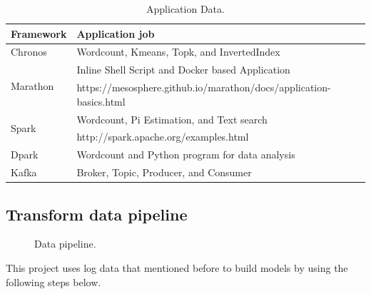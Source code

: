 \documentclass[12pt,oneside,openright,a4paper]{cpe-english-project}
\begin{document}
\begin{table}[!h]
  \caption{Application Data.}\label{tbl:ApplicationData}
    \begin{tabular}{@{}|p{}|p{}|}
    \hline
    \textbf{Framework} & \textbf{Application job}\\
    \hline
    Chronos & Wordcount, Kmeans, Topk, and InvertedIndex\\
    \hline
    \multirow{2}{*}{Marathon} & Inline Shell Script and Docker based Application \\
    & https://mesosphere.github.io/marathon/docs/application-basics.html\\
    \hline
    \multirow{2}{*}{Spark} & Wordcount, Pi Estimation, and Text search\\
    & http://spark.apache.org/examples.html\\
    \hline
    Dpark & Wordcount and Python program for data analysis\\
    \hline
    Kafka & Broker, Topic, Producer, and Consumer\\
    \hline
  \end{tabular}
\end{table}

\newpage

\subsection{Transform data pipeline}

\begin{figure}[!h]\centering
  \setlength{\fboxrule}{0mm} %
  \setlength{\fboxsep}{0cm}
  \caption{Data pipeline.}\label{fig:dataPipeline}
\end{figure}

This project uses log data that mentioned before to build models by using the following steps below.
\end{document}
